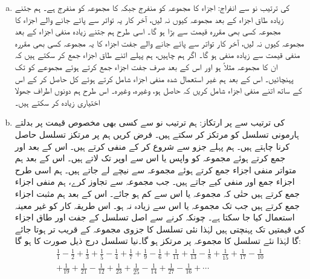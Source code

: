 \begin{enumerate}[a.]
\item
{} کی ترتیب نو سے انفراج: \quad
اجزاء  کا مجموعہ  کو منفرج جبکہ  کا مجموعہ  کو منفرج ہے۔ ہم جتنے زیادہ طاق اجزاء کے بعد  مجموعہ کیوں نہ لیں، آخر کار یہ تواتر سے پائے جانے والے اجزاء کا مجموعہ کسی بھی مقررہ قیمت سے بڑا ہو گا۔ اسی طرح ہم  جتنے زیادہ منفی اجزاء کے بعد  مجموعہ کیوں نہ لیں، آخر کار تواتر سے پائے جانے والے جفت اجزاء کا یہ مجموعہ کسی بھی مقررہ منفی قیمت سے زیادہ منفی ہو گا۔ اگر ہم چاہیں، ہم پہلے اتنے طاق اجزاء جمع کر سکتے ہیں کہ ان کا مجموعہ مثلاً  ہو اور اس کے بعد صرف جفت اجزاء جمع کرتے ہوئے مجموعے کو  تک پہنچائیں۔ اس کے بعد ہم غیر استعمال شدہ منفی اجزاء شامل کرتے ہوئے کل حاصل کر کے اس کے ساتھ اتنے منفی اجزاء شامل کریں کہ  حاصل ہو، وغیرہ، وغیرہ۔ اس طرح ہم دونوں اطراف جھولا اختیاری زیادہ کر سکتے ہیں۔ 
\item
{} کی ترتیب سے  پر ارتکاز:\quad
ہم ترتیب نو سے کسی بھی مخصوص قیمت پر بدلتے ہارمونی تسلسل کو مرتکز کر سکتے ہیں۔ فرض کریں ہم  پر مرتکز تسلسل حاصل کرنا چاہتے ہیں۔ ہم پہلے جزو  سے شروع کر کے  منفی کرتے ہیں۔ اس کے بعد  اور  جمع کرتے ہوئے مجموعہ کو واپس  یا اس سے اوپر تک لاتے ہیں۔ اس کے بعد ہم متواتر منفی اجزاء جمع کرتے ہوئے مجموعہ  سے نیچے لے جاتے ہیں۔ ہم اسی طرح اجزاء جمع اور منفی کیے جاتے ہیں۔ جب مجموعہ  سے تجاوز کرے، ہم منفی اجزاء جمع کرتے ہیں حتٰی کہ مجموعہ  یا اس سے کم ہو جائے۔ اس کے بعد ہم مثبت اجزاء جمع کرتے ہیں جب تک مجموعہ  یا اس سے زیادہ نہ ہو۔ اس طریقہ کار کو غیر معینہ استعمال کیا جا سکتا ہے۔ چونکہ  کرنے سے اصل تسلسل کے جفت اور طاق اجزاء کی قیمتیں  تک پہنچتی ہیں لہٰذا  نئی تسلسل کا جزوی مجموعہ   کے قریب تر ہوتا جائے گا لہٰذا نئے تسلسل کا مجموعہ  پر مرتکز ہو گا۔نیا تسلسل درج ذیل صورت کا ہو گا:
\begin{multline*}
\frac{1}{1}-\frac{1}{2}+\frac{1}{3}+\frac{1}{5}-\frac{1}{4}+\frac{1}{7}+\frac{1}{9}-\frac{1}{6}+\frac{1}{11}+\frac{1}{13}-\frac{1}{8}+\frac{1}{15}+\frac{1}{17}-\frac{1}{10}\\+\frac{1}{19}+\frac{1}{21}-\frac{1}{12}+\frac{1}{23}+\frac{1}{25}-\frac{1}{14}+\frac{1}{27}-\frac{1}{16}+\cdots
\end{multline*}
\end{enumerate}

